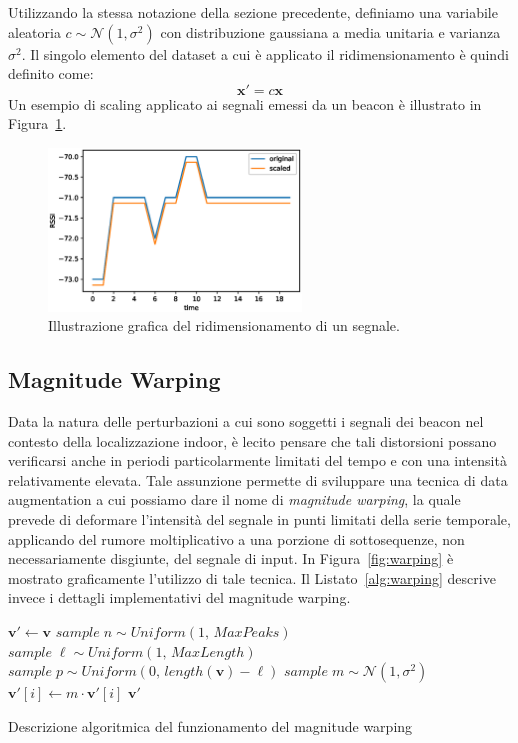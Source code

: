 Utilizzando la stessa notazione della sezione precedente, definiamo una
variabile aleatoria \(c \sim \mathcal{N}(1, \sigma^2)\) con distribuzione
gaussiana a media unitaria e varianza \(\sigma^2\). Il singolo elemento del
dataset a cui è applicato il ridimensionamento è quindi definito come:
\[ \bm x' = c \bm x \] 
Un esempio di scaling applicato ai segnali emessi da un beacon è illustrato in
Figura~\ref{fig:scaling}.
\begin{figure}[htp]
  \centering\includegraphics[width=0.6\textwidth]{./img/scaling.eps}
  \caption{Illustrazione grafica del ridimensionamento di un segnale.}%
  \label{fig:scaling}%
\end{figure}

\subsection{Magnitude Warping}\label{subsec:warping}
Data la natura delle perturbazioni a cui sono soggetti i segnali dei beacon nel
contesto della localizzazione indoor, è lecito pensare che tali distorsioni
possano verificarsi anche in periodi particolarmente limitati del tempo e con
una intensità relativamente elevata. Tale assunzione permette di sviluppare una
tecnica di data augmentation a cui possiamo dare il nome di \emph{magnitude
  warping}, la quale prevede di deformare l'intensità del segnale in punti
limitati della serie temporale, applicando del rumore moltiplicativo a una
porzione di sottosequenze, non necessariamente disgiunte, del segnale di input.
In Figura~\ref{fig:warping} è mostrato graficamente l'utilizzo di tale tecnica.
Il Listato~\ref{alg:warping} descrive invece i dettagli implementativi del
magnitude warping.
\begin{algorithm}%
  \begin{algorithmic}
      \State $\bm v' \gets \bm v$
      \State $sample\; n \sim \mathit{Uniform}(1,\, \mathit{MaxPeaks})$
        \State $sample\; \ell \sim \mathit{Uniform}(1,\, \mathit{MaxLength})$
        \State $sample\; p \sim \mathit{Uniform}(0,\, length(\bm v) - \ell)$
        \State $sample\; m \sim \mathcal{N}(1, \sigma^2)$
        \State $\bm v'[i] \gets m \cdot \bm v'[i]$
        \EndFor
      \EndFor
      \Return $\bm v'$
    \EndFunction
  \end{algorithmic}
  \caption{Descrizione algoritmica del funzionamento del magnitude warping}
  \label{alg:warping}
\end{algorithm}

